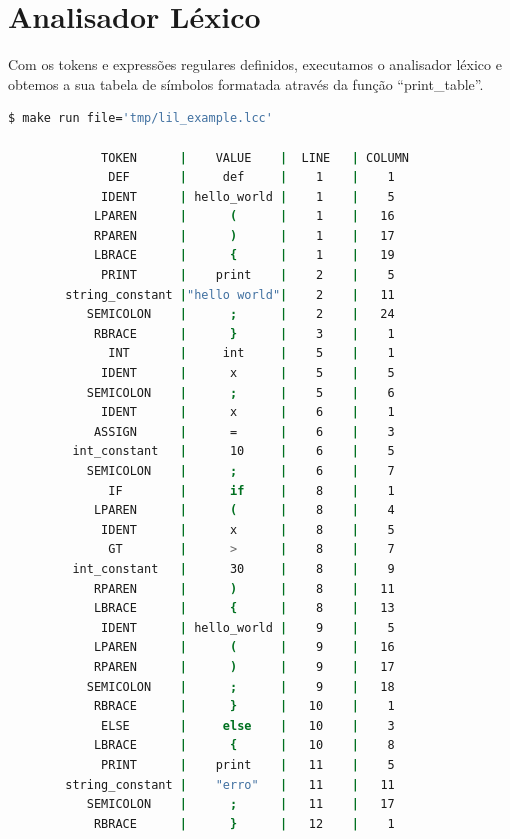 \documentclass[
	12pt,				%
	openright,			%
	twoside,			%
	a4paper,			%
	english,			%
	french,				%
	spanish,			%
	brazil				%
	]{abntex2}
\begin{document}
\section{Analisador Léxico}
Com os tokens e expressões regulares definidos, executamos o analisador léxico e obtemos
a sua tabela de símbolos formatada através da função ``print\_table''.

\begin{lstlisting}[language=bash]
		$ make run file='tmp/lil_example.lcc'

             TOKEN      |    VALUE    |  LINE   | COLUMN 
              DEF       |     def     |    1    |    1   
             IDENT      | hello_world |    1    |    5   
            LPAREN      |      (      |    1    |   16   
            RPAREN      |      )      |    1    |   17   
            LBRACE      |      {      |    1    |   19   
             PRINT      |    print    |    2    |    5   
        string_constant |"hello world"|    2    |   11   
           SEMICOLON    |      ;      |    2    |   24   
            RBRACE      |      }      |    3    |    1   
              INT       |     int     |    5    |    1   
             IDENT      |      x      |    5    |    5   
           SEMICOLON    |      ;      |    5    |    6   
             IDENT      |      x      |    6    |    1   
            ASSIGN      |      =      |    6    |    3   
         int_constant   |      10     |    6    |    5   
           SEMICOLON    |      ;      |    6    |    7   
              IF        |      if     |    8    |    1   
            LPAREN      |      (      |    8    |    4   
             IDENT      |      x      |    8    |    5   
              GT        |      >      |    8    |    7   
         int_constant   |      30     |    8    |    9   
            RPAREN      |      )      |    8    |   11   
            LBRACE      |      {      |    8    |   13   
             IDENT      | hello_world |    9    |    5   
            LPAREN      |      (      |    9    |   16   
            RPAREN      |      )      |    9    |   17   
           SEMICOLON    |      ;      |    9    |   18   
            RBRACE      |      }      |   10    |    1   
             ELSE       |     else    |   10    |    3   
            LBRACE      |      {      |   10    |    8   
             PRINT      |    print    |   11    |    5   
        string_constant |    "erro"   |   11    |   11   
           SEMICOLON    |      ;      |   11    |   17   
            RBRACE      |      }      |   12    |    1  
\end{lstlisting}
\end{document}
